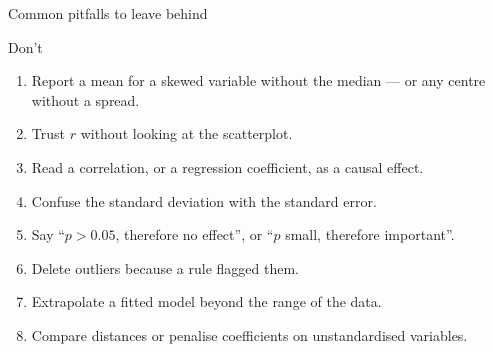 \documentclass[aspectratio=169,11pt]{beamer}
\begin{document}
\begin{frame}{Common pitfalls to leave behind}
  \begin{alertblock}{Don't}
    \begin{enumerate}
      \item Report a mean for a skewed variable without the median --- or any
            centre without a spread.
      \item Trust $r$ without looking at the scatterplot.
      \item Read a correlation, or a regression coefficient, as a causal
            effect.
      \item Confuse the standard deviation with the standard error.
      \item Say ``$p > 0.05$, therefore no effect'', or ``$p$ small,
            therefore important''.
      \item Delete outliers because a rule flagged them.
      \item Extrapolate a fitted model beyond the range of the data.
      \item Compare distances or penalise coefficients on unstandardised
            variables.
    \end{enumerate}
  \end{alertblock}
\end{frame}
\end{document}
